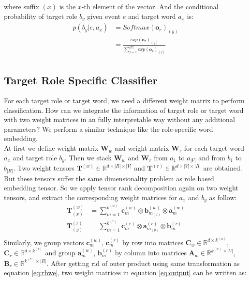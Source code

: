 \documentclass[a4paper]{article}
\begin{document}
where suffix $(x)$ is the $x$-th element of the vector. And the conditional probability of target role $b_y$ given event $e$ and target word $a_x$ is:
\begin{equation} \label{eq:softmax_r}
\begin{aligned}
    p(b_y | e, a_x)
        &= Softmax(\mathbf{o}_r)_{(y)} \\
        &= \frac{
        exp(\mathbf{o}_r)_{(y)}
        }{
        \sum_{j=1}^{|R|} exp(\mathbf{o}_r)_{(j)} }   \\
\end{aligned}
\end{equation}



\subsection{Target Role Specific Classifier}
For each target role or target word, we need a different weight matrix to perform classification. How can we integrate the information of target role or target word with two weight matrices in an fully interpretable way without any additional parameters? We perform a similar technique like the role-specific word embedding. \\
At first we define weight matrix $\mathbf{W}_w$ and weight matrix $\mathbf{W}_r$ for each target word $a_x$ and target role $b_y$. Then we stack $\mathbf{W}_w$ and $\mathbf{W}_r$ from $a_1$ to $a_{|V|}$ and from $b_1$ to $b_{|R|}$. Two weight tensors $\mathbf{T}^{(w)} \in \mathbb{R}^{d \times |R| \times |V|}$ and $\mathbf{T}^{(r)} \in \mathbb{R}^{d \times |V| \times |R|}$ are obtained. But these tensors suffer the same dimensionality problem as role based embedding tensor. So we apply tensor rank decomposition again on two weight tensors, and extract the corresponding weight matrices for $a_x$ and $b_y$ as follow: 
\begin{equation} \label{eq:trd_cls}
\begin{aligned}
    \mathbf{T}_{(x)}^{(w)}
        &= \sum_{m=1}^{k^{(w)}} \mathbf{c}_{m}^{(w)} \otimes \mathbf{b}_{m_{(x)}}^{(w)} \otimes \mathbf{a}_m^{(w)} \\
    \mathbf{T}_{(y)}^{(r)}
        &= \sum_{m=1}^{k^{(r)}} \mathbf{c}_{m}^{(r)} \otimes  \mathbf{a}_{m_{(y)}}^{(r)} \otimes \mathbf{b}_m^{(r)} \\
\end{aligned}
\end{equation}
Similarly, we group vectors $\mathbf{c}_{m}^{(w)}$, $\mathbf{c}_{m}^{(r)}$ by row into matrices $\mathbf{C}_w \in \mathbb{R}^{d \times k^{(w)}}$, $\mathbf{C}_r \in \mathbb{R}^{d \times k^{(r)}}$ and group $\mathbf{a}_m^{(w)}$, $\mathbf{b}_m^{(r)}$ by column into matrices $\mathbf{A}_w \in \mathbb{R}^{k^{(w)} \times |V|}$, $\mathbf{B}_r \in \mathbb{R}^{k^{(r)} \times |R|}$. After getting rid of outer product using same transformation as equation \eqref{eq:rbwe}, two weight matrices in equation \eqref{eq:output}  can be written as: 
\end{document}
